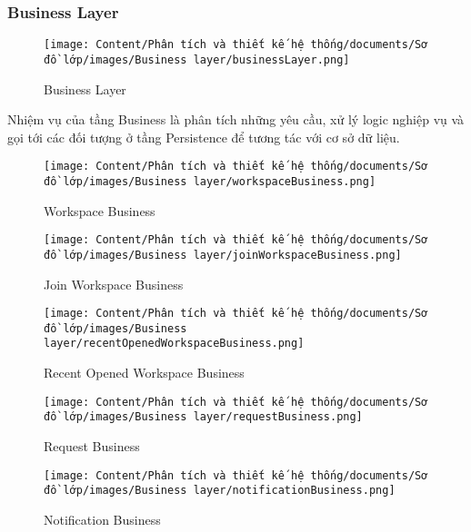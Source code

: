 \subsubsection{Business Layer}

\begin{figure}[H]
    \centering
    \texttt{[image: Content/Phân tích và thiết kế hệ thống/documents/Sơ đồ lớp/images/Business layer/businessLayer.png]}
    \vspace{0.5cm}
    \caption{Business Layer}
    \label{fig:enter-label}
\end{figure}

Nhiệm vụ của tầng Business là phân tích những yêu cầu, xử lý logic nghiệp vụ và gọi tới các đối tượng ở tầng Persistence để tương tác với cơ sở dữ liệu.

\begin{figure}[H]
    \centering
    \texttt{[image: Content/Phân tích và thiết kế hệ thống/documents/Sơ đồ lớp/images/Business layer/workspaceBusiness.png]}
    \vspace{0.5cm}
    \caption{Workspace Business}
    \label{fig:enter-label}
\end{figure}

\begin{figure}[H]
    \centering
    \texttt{[image: Content/Phân tích và thiết kế hệ thống/documents/Sơ đồ lớp/images/Business layer/joinWorkspaceBusiness.png]}
    \vspace{0.5cm}
    \caption{Join Workspace Business}
    \label{fig:enter-label}
\end{figure}

\begin{figure}[H]
    \centering
    \texttt{[image: Content/Phân tích và thiết kế hệ thống/documents/Sơ đồ lớp/images/Business layer/recentOpenedWorkspaceBusiness.png]}
    \vspace{0.5cm}
    \caption{Recent Opened Workspace Business}
    \label{fig:enter-label}
\end{figure}

\begin{figure}[H]
    \centering
    \texttt{[image: Content/Phân tích và thiết kế hệ thống/documents/Sơ đồ lớp/images/Business layer/requestBusiness.png]}
    \vspace{0.5cm}
    \caption{Request Business}
    \label{fig:enter-label}
\end{figure}

\begin{figure}[H]
    \centering
    \texttt{[image: Content/Phân tích và thiết kế hệ thống/documents/Sơ đồ lớp/images/Business layer/notificationBusiness.png]}
    \vspace{0.5cm}
    \caption{Notification Business}
    \label{fig:enter-label}
\end{figure}

